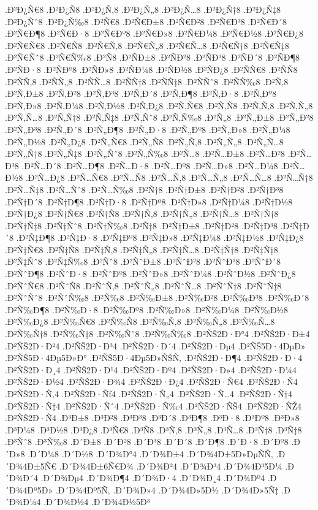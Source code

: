 {.Ð²Ð¿Ñ€8
.Ð²Ð¿Ñ8
.Ð²Ð¿Ñ‚8
.Ð²Ð¿Ñ„8
.Ð²Ð¿Ñ…8
.Ð²Ð¿Ñ†8
.Ð²Ð¿Ñ‡8
.Ð²Ð¿Ñˆ8
.Ð²Ð¿Ñ‰8
.Ð²Ñ€8
.Ð²Ñ€Ð±8
.Ð²Ñ€Ð²8
.Ð²Ñ€Ð³8
.Ð²Ñ€Ð´8
.Ð²Ñ€Ð¶8
.Ð²Ñ€Ð·8
.Ð²Ñ€Ðº8
.Ð²Ñ€Ð»8
.Ð²Ñ€Ð¼8
.Ð²Ñ€Ð½8
.Ð²Ñ€Ð¿8
.Ð²Ñ€Ñ€8
.Ð²Ñ€Ñ8
.Ð²Ñ€Ñ‚8
.Ð²Ñ€Ñ„8
.Ð²Ñ€Ñ…8
.Ð²Ñ€Ñ†8
.Ð²Ñ€Ñ‡8
.Ð²Ñ€Ñˆ8
.Ð²Ñ€Ñ‰8
.Ð²Ñ8
.Ð²ÑÐ±8
.Ð²ÑÐ²8
.Ð²ÑÐ³8
.Ð²ÑÐ´8
.Ð²ÑÐ¶8
.Ð²ÑÐ·8
.Ð²ÑÐº8
.Ð²ÑÐ»8
.Ð²ÑÐ¼8
.Ð²ÑÐ½8
.Ð²ÑÐ¿8
.Ð²ÑÑ€8
.Ð²ÑÑ8
.Ð²ÑÑ‚8
.Ð²ÑÑ„8
.Ð²ÑÑ…8
.Ð²ÑÑ†8
.Ð²ÑÑ‡8
.Ð²ÑÑˆ8
.Ð²ÑÑ‰8
.Ð²Ñ‚8
.Ð²Ñ‚Ð±8
.Ð²Ñ‚Ð²8
.Ð²Ñ‚Ð³8
.Ð²Ñ‚Ð´8
.Ð²Ñ‚Ð¶8
.Ð²Ñ‚Ð·8
.Ð²Ñ‚Ðº8
.Ð²Ñ‚Ð»8
.Ð²Ñ‚Ð¼8
.Ð²Ñ‚Ð½8
.Ð²Ñ‚Ð¿8
.Ð²Ñ‚Ñ€8
.Ð²Ñ‚Ñ8
.Ð²Ñ‚Ñ‚8
.Ð²Ñ‚Ñ„8
.Ð²Ñ‚Ñ…8
.Ð²Ñ‚Ñ†8
.Ð²Ñ‚Ñ‡8
.Ð²Ñ‚Ñˆ8
.Ð²Ñ‚Ñ‰8
.Ð²Ñ„8
.Ð²Ñ„Ð±8
.Ð²Ñ„Ð²8
.Ð²Ñ„Ð³8
.Ð²Ñ„Ð´8
.Ð²Ñ„Ð¶8
.Ð²Ñ„Ð·8
.Ð²Ñ„Ðº8
.Ð²Ñ„Ð»8
.Ð²Ñ„Ð¼8
.Ð²Ñ„Ð½8
.Ð²Ñ„Ð¿8
.Ð²Ñ„Ñ€8
.Ð²Ñ„Ñ8
.Ð²Ñ„Ñ‚8
.Ð²Ñ„Ñ„8
.Ð²Ñ„Ñ…8
.Ð²Ñ„Ñ†8
.Ð²Ñ„Ñ‡8
.Ð²Ñ„Ñˆ8
.Ð²Ñ„Ñ‰8
.Ð²Ñ…8
.Ð²Ñ…Ð±8
.Ð²Ñ…Ð²8
.Ð²Ñ…Ð³8
.Ð²Ñ…Ð´8
.Ð²Ñ…Ð¶8
.Ð²Ñ…Ð·8
.Ð²Ñ…Ðº8
.Ð²Ñ…Ð»8
.Ð²Ñ…Ð¼8
.Ð²Ñ…Ð½8
.Ð²Ñ…Ð¿8
.Ð²Ñ…Ñ€8
.Ð²Ñ…Ñ8
.Ð²Ñ…Ñ‚8
.Ð²Ñ…Ñ„8
.Ð²Ñ…Ñ…8
.Ð²Ñ…Ñ†8
.Ð²Ñ…Ñ‡8
.Ð²Ñ…Ñˆ8
.Ð²Ñ…Ñ‰8
.Ð²Ñ†8
.Ð²Ñ†Ð±8
.Ð²Ñ†Ð²8
.Ð²Ñ†Ð³8
.Ð²Ñ†Ð´8
.Ð²Ñ†Ð¶8
.Ð²Ñ†Ð·8
.Ð²Ñ†Ðº8
.Ð²Ñ†Ð»8
.Ð²Ñ†Ð¼8
.Ð²Ñ†Ð½8
.Ð²Ñ†Ð¿8
.Ð²Ñ†Ñ€8
.Ð²Ñ†Ñ8
.Ð²Ñ†Ñ‚8
.Ð²Ñ†Ñ„8
.Ð²Ñ†Ñ…8
.Ð²Ñ†Ñ†8
.Ð²Ñ†Ñ‡8
.Ð²Ñ†Ñˆ8
.Ð²Ñ†Ñ‰8
.Ð²Ñ‡8
.Ð²Ñ‡Ð±8
.Ð²Ñ‡Ð²8
.Ð²Ñ‡Ð³8
.Ð²Ñ‡Ð´8
.Ð²Ñ‡Ð¶8
.Ð²Ñ‡Ð·8
.Ð²Ñ‡Ðº8
.Ð²Ñ‡Ð»8
.Ð²Ñ‡Ð¼8
.Ð²Ñ‡Ð½8
.Ð²Ñ‡Ð¿8
.Ð²Ñ‡Ñ€8
.Ð²Ñ‡Ñ8
.Ð²Ñ‡Ñ‚8
.Ð²Ñ‡Ñ„8
.Ð²Ñ‡Ñ…8
.Ð²Ñ‡Ñ†8
.Ð²Ñ‡Ñ‡8
.Ð²Ñ‡Ñˆ8
.Ð²Ñ‡Ñ‰8
.Ð²Ñˆ8
.Ð²ÑˆÐ±8
.Ð²ÑˆÐ²8
.Ð²ÑˆÐ³8
.Ð²ÑˆÐ´8
.Ð²ÑˆÐ¶8
.Ð²ÑˆÐ·8
.Ð²ÑˆÐº8
.Ð²ÑˆÐ»8
.Ð²ÑˆÐ¼8
.Ð²ÑˆÐ½8
.Ð²ÑˆÐ¿8
.Ð²ÑˆÑ€8
.Ð²ÑˆÑ8
.Ð²ÑˆÑ‚8
.Ð²ÑˆÑ„8
.Ð²ÑˆÑ…8
.Ð²ÑˆÑ†8
.Ð²ÑˆÑ‡8
.Ð²ÑˆÑˆ8
.Ð²ÑˆÑ‰8
.Ð²Ñ‰8
.Ð²Ñ‰Ð±8
.Ð²Ñ‰Ð²8
.Ð²Ñ‰Ð³8
.Ð²Ñ‰Ð´8
.Ð²Ñ‰Ð¶8
.Ð²Ñ‰Ð·8
.Ð²Ñ‰Ðº8
.Ð²Ñ‰Ð»8
.Ð²Ñ‰Ð¼8
.Ð²Ñ‰Ð½8
.Ð²Ñ‰Ð¿8
.Ð²Ñ‰Ñ€8
.Ð²Ñ‰Ñ8
.Ð²Ñ‰Ñ‚8
.Ð²Ñ‰Ñ„8
.Ð²Ñ‰Ñ…8
.Ð²Ñ‰Ñ†8
.Ð²Ñ‰Ñ‡8
.Ð²Ñ‰Ñˆ8
.Ð²Ñ‰Ñ‰8
.Ð²ÑŠ2Ð·Ð°4
.Ð²ÑŠ2Ð·Ð±4
.Ð²ÑŠ2Ð·Ð²4
.Ð²ÑŠ2Ð·Ð³4
.Ð²ÑŠ2Ð·Ð´4
.Ð²ÑŠ2Ð·Ðµ4
.Ð²ÑŠ5Ð·4ÐµÐ»
.Ð²ÑŠ5Ð·4Ðµ5Ð»Ð°
.Ð²ÑŠ5Ð·4Ðµ5Ð»ÑŠÑ‚
.Ð²ÑŠ2Ð·Ð¶4
.Ð²ÑŠ2Ð·Ð·4
.Ð²ÑŠ2Ð·Ð¸4
.Ð²ÑŠ2Ð·Ð¹4
.Ð²ÑŠ2Ð·Ðº4
.Ð²ÑŠ2Ð·Ð»4
.Ð²ÑŠ2Ð·Ð¼4
.Ð²ÑŠ2Ð·Ð½4
.Ð²ÑŠ2Ð·Ð¾4
.Ð²ÑŠ2Ð·Ð¿4
.Ð²ÑŠ2Ð·Ñ€4
.Ð²ÑŠ2Ð·Ñ4
.Ð²ÑŠ2Ð·Ñ‚4
.Ð²ÑŠ2Ð·Ñƒ4
.Ð²ÑŠ2Ð·Ñ„4
.Ð²ÑŠ2Ð·Ñ…4
.Ð²ÑŠ2Ð·Ñ†4
.Ð²ÑŠ2Ð·Ñ‡4
.Ð²ÑŠ2Ð·Ñˆ4
.Ð²ÑŠ2Ð·Ñ‰4
.Ð²ÑŠ2Ð·ÑŠ4
.Ð²ÑŠ2Ð·ÑŽ4
.Ð²ÑŠ2Ð·Ñ4
.Ð³Ð±8
.Ð³Ð²8
.Ð³Ð³8
.Ð³Ð´8
.Ð³Ð¶8
.Ð³Ð·8
.Ð³Ðº8
.Ð³Ð»8
.Ð³Ð¼8
.Ð³Ð½8
.Ð³Ð¿8
.Ð³Ñ€8
.Ð³Ñ8
.Ð³Ñ‚8
.Ð³Ñ„8
.Ð³Ñ…8
.Ð³Ñ†8
.Ð³Ñ‡8
.Ð³Ñˆ8
.Ð³Ñ‰8
.Ð´Ð±8
.Ð´Ð²8
.Ð´Ð³8
.Ð´Ð´8
.Ð´Ð¶8
.Ð´Ð·8
.Ð´Ðº8
.Ð´Ð»8
.Ð´Ð¼8
.Ð´Ð½8
.Ð´Ð¾Ð°4
.Ð´Ð¾Ð±4
.Ð´Ð¾4Ð±5Ð»ÐµÑÑ‚
.Ð´Ð¾4Ð±5Ñ€
.Ð´Ð¾4Ð±6Ñ€Ð¾
.Ð´Ð¾Ð²4
.Ð´Ð¾Ð³4
.Ð´Ð¾4Ð³5Ð¼
.Ð´Ð¾Ð´4
.Ð´Ð¾Ðµ4
.Ð´Ð¾Ð¶4
.Ð´Ð¾Ð·4
.Ð´Ð¾Ð¸4
.Ð´Ð¾Ðº4
.Ð´Ð¾4Ðº5Ð»
.Ð´Ð¾4Ðº5Ñ‚
.Ð´Ð¾Ð»4
.Ð´Ð¾4Ð»5Ð½
.Ð´Ð¾4Ð»5Ñ‡
.Ð´Ð¾Ð¼4
.Ð´Ð¾Ð½4
.Ð´Ð¾4Ð½5Ð³
}
